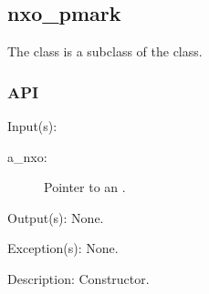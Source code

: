 %
%
%
%
%

\subsection{nxo\_pmark}
\label{nxo_pmark}

The  class is a subclass of the  class.

\subsubsection{API}
\begin{capi}
\label{nxo_pmark_new}
	\begin{capilist}
	\item[Input(s): ]
		\begin{description}\item[]
		\item[a\_nxo: ]
			Pointer to an .
		\end{description}
	\item[Output(s): ] None.
	\item[Exception(s): ] None.
	\item[Description: ]
		Constructor.
	\end{capilist}
\end{capi}
